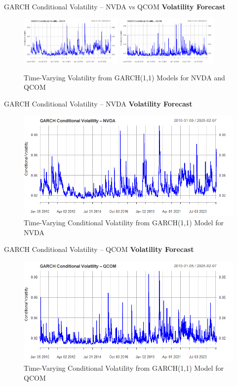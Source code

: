 \documentclass{beamer}[9pt]
\begin{document}
\begin{frame}{GARCH Conditional Volatility – NVDA vs QCOM}
	\textbf{Volatility Forecast }
	\begin{figure}[!h]
		\centering
		\includegraphics[width=0.45\textwidth]{plots/nvda_garch_vol.png}
		\hspace{0.05\textwidth}
		\includegraphics[width=0.45\textwidth]{plots/qcom_garch_vol.png}
		\caption{Time-Varying Volatility from GARCH(1,1) Models for NVDA and QCOM}
	\end{figure}
\end{frame}

\begin{frame}{GARCH Conditional Volatility – NVDA}
	\textbf{Volatility Forecast}
	\begin{figure}[!h]
		\centering
		\includegraphics[width=0.85\linewidth]{plots/nvda_garch_vol.png}
		\caption{Time-Varying Conditional Volatility from GARCH(1,1) Model for NVDA}
	\end{figure}
\end{frame}

\begin{frame}{GARCH Conditional Volatility – QCOM}
	\textbf{Volatility Forecast}
	\begin{figure}[!h]
		\centering
		\includegraphics[width=0.85\linewidth]{plots/qcom_garch_vol.png}
		\caption{Time-Varying Conditional Volatility from GARCH(1,1) Model for QCOM}
	\end{figure}
\end{frame}
\end{document}
